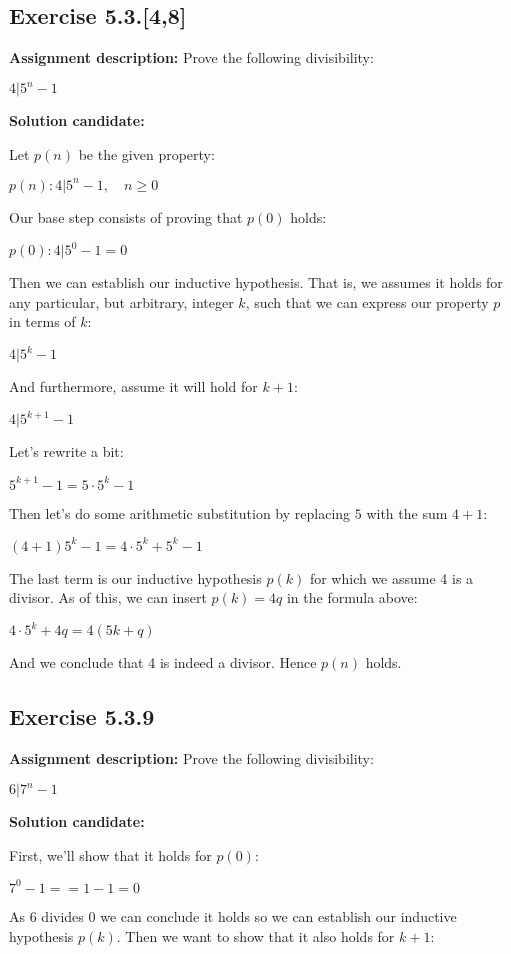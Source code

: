 \documentclass{report}
\newcommand{\cent}[1]{\begin{center}#1\end{center}}
\newcommand{\AssignmentDescription}{\textbf{Assignment description: }}
\newcommand{\Solution}{\textbf{Solution candidate: }}
\newcommand{\QED}{\boxed{}}
\newcommand{\Exercise}[1]{\subsection{Exercise #1}}
\begin{document}
 	\QED
 	
 	\Exercise{5.3.[4,8]}
 	
 	\AssignmentDescription
 	Prove the following divisibility:
 	\newcommand{\givenFormula}[1]{\ensuremath{4|5^{#1} -1}}
 	\cent{\givenFormula{n}}
 	
 	\Solution
 	
 	Let $p(n)$ be the given property:
 	
 	\cent{$p(n) : \givenFormula{n}, \quad n \geq 0$}
 	
 	
 	Our base step consists of proving that $p(0)$ holds:
 	
 	\cent{$p(0) :4|5^0 -1 = 0$}
 	
 	Then we can establish our inductive hypothesis. That is, we assumes it holds for any particular, but arbitrary, integer $k$, such that we can express our property $p$ in terms of $k$:
 	
 	\cent{\givenFormula{k}}
 	
 	And furthermore, assume it will hold for $k+1$:
 	
 	\cent{$\givenFormula{k+1}$}
 	
 	Let's rewrite a bit:
 	
	\cent{$5^{k+1}-1 = 5 \cdot  5^k -1$}
	
	Then let's do some arithmetic substitution by replacing $5$ with the sum $4+1$:
	
	\cent{$ (4+1)5^k -1 = 4 \cdot 5^k + 5^k - 1$}
	
	The last term is our inductive hypothesis $p(k)$ for which we assume 4 is a divisor. As of this, we can insert $p(k) = 4q$ in the formula above:
	
	\cent{ $ 4 \cdot 5^k + 4q = 4(5k + q)$}
	
	And we conclude that 4 is indeed a divisor. Hence $p(n)$ holds.\\
	
	\QED
	
	
 	\Exercise{5.3.9}
 	
 	\AssignmentDescription
 	Prove the following divisibility:
 	
 	\cent{$6|7^n-1$}
 	
 	\Solution
 	
 	First, we'll show that it holds for $p(0)$:
 	
 	\cent{$7^0-1 = = 1 - 1 =  0$}
 	
 	As $6$ divides $0$ we can conclude it holds so we can establish our inductive hypothesis $p(k)$. Then we want to show that it also holds for $k+1$:
 	
\end{document}
